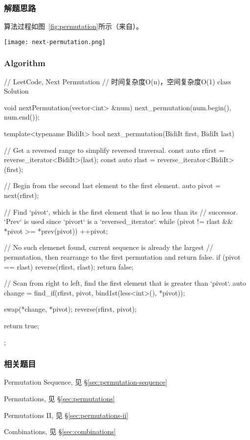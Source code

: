 \subsubsection{解题思路}
算法过程如图~\ref{fig:permutation}所示（来自）。

\begin{center}
	\texttt{[image: next-permutation.png]}\\
	\label{fig:permutation}
\end{center}


\subsubsection{Algorithm}
\begin{Code}
	// LeetCode, Next Permutation
	// 时间复杂度O(n)，空间复杂度O(1)
	class Solution {
		void nextPermutation(vector<int> &num) {
			next_permutation(num.begin(), num.end());
		}
		
		template<typename BidiIt>
		bool next_permutation(BidiIt first, BidiIt last) {
			// Get a reversed range to simplify reversed traversal.
			const auto rfirst = reverse_iterator<BidiIt>(last);
			const auto rlast = reverse_iterator<BidiIt>(first);
			
			// Begin from the second last element to the first element.
			auto pivot = next(rfirst);
			
			// Find `pivot`, which is the first element that is no less than its
			// successor.  `Prev` is used since `pivort` is a `reversed_iterator`.
			while (pivot != rlast && *pivot >= *prev(pivot))
			++pivot;
			
			// No such elemenet found, current sequence is already the largest
			// permutation, then rearrange to the first permutation and return false.
			if (pivot == rlast) {
				reverse(rfirst, rlast);
				return false;
			}
			
			// Scan from right to left, find the first element that is greater than `pivot`.
			auto change = find_if(rfirst, pivot, bind1st(less<int>(), *pivot));
			
			swap(*change, *pivot);
			reverse(rfirst, pivot);
			
			return true;
		}
	};
\end{Code}


\subsubsection{相关题目}
\begindot
\item Permutation Sequence, 见 \S \ref{sec:permutation-sequence}
\item Permutations, 见 \S \ref{sec:permutations}
\item Permutations II, 见 \S \ref{sec:permutations-ii}
\item Combinations, 见 \S \ref{sec:combinations}
\myenddot


